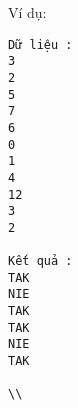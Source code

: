 Ví dụ:  
\begin{verbatim}
Dữ liệu :
3
2
5
7
6
0
1
4
12
3
2

Kết quả :
TAK
NIE
TAK
TAK
NIE
TAK

\\\end{verbatim}